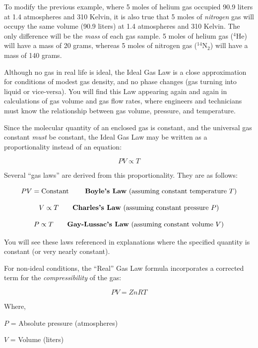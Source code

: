 To modify the previous example, where 5 moles of helium gas occupied 90.9 liters at 1.4 atmospheres and 310 Kelvin, it is also true that 5 moles of \textit{nitrogen} gas will occupy the same volume (90.9 liters) at 1.4 atmospheres and 310 Kelvin.  The only difference will be the \textit{mass} of each gas sample.  5 moles of helium gas ($^{4}$He) will have a mass of 20 grams, whereas 5 moles of nitrogen gas ($^{14}$N$_{2}$) will have a mass of 140 grams.

Although no gas in real life is ideal, the Ideal Gas Law is a close approximation for conditions of modest gas density, and no phase changes (gas turning into liquid or vice-versa).  You will find this Law appearing again and again in calculations of gas volume and gas flow rates, where engineers and technicians must know the relationship between gas volume, pressure, and temperature.

\vskip 10pt

\filbreak

Since the molecular quantity of an enclosed gas is constant, and the universal gas constant \textit{must} be constant, the Ideal Gas Law may be written as a proportionality instead of an equation:

$$PV \propto T$$

Several ``gas laws'' are derived from this proportionality.  They are as follows: 

$$PV = \hbox{Constant \hskip 20pt \textbf{Boyle's Law} (assuming constant temperature } T \hbox{)}$$ 

$$V \propto T \hbox{\hskip 20pt \textbf{Charles's Law} (assuming constant pressure } P \hbox{)}$$ 

$$P \propto T \hbox{\hskip 20pt \textbf{Gay-Lussac's Law} (assuming constant volume } V \hbox{)}$$ 

You will see these laws referenced in explanations where the specified quantity is constant (or very nearly constant).

\vskip 10pt

For non-ideal conditions, the ``Real'' Gas Law formula incorporates a corrected term for the \textit{compressibility} of the gas:  

$$PV = ZnRT$$

\noindent
Where,

$P$ = Absolute pressure (atmospheres)

$V$ = Volume (liters)


